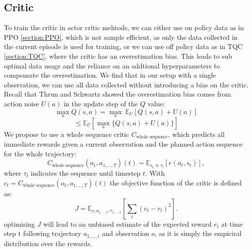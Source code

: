\subsection{Critic}
\label{sec:AC_Critic}
To train the critic in actor critic mehtods, we can either use on policy data as in PPO \ref{section:PPO}, which is not sample efficient, as only the data collected 
in the current episode is used for training, or we can use off policy data as in TQC \ref{section:TQC}, where the critic has an overestimation bias. This 
leads to sub optimal data usage and the reliance on an addtional hyperparameters to compensate the overestimation. We find that in our setup with a single observation, we can use all data 
collected without introducing a bias on the critic. \\
Recall that Thrun and Schwartz \cite{thrun1993issues} showed the overestimation bias comes from action noise $U(a)$ in the update step of the $Q$ value:
\begin{equation*}
    \max_{a}Q(s,a) = \max_{a}\ \mathbb{E}_U \left[Q(s,a) + U(a)\right]
\end{equation*}
\begin{equation}
    \leq \mathbb{E}_U \left[\max_a \{Q(s,a) + U(a)\}\right]
\end{equation}
We propose to use a whole sequence critic $C_{\text{whole sequence}}$, which predicts all immediate rewards given a current observation 
and the planned action sequence for the whole trajectory:
\begin{equation}
    \label{eq:emp_mean_c}
    C_{\text{whole sequence}}(o_1, a_{1, ..., T})(t) = \mathbb{E}_{s_t \propto \tau_t}\left[r(a_t, s_t)\right],
\end{equation}
where $\tau_t$ indicates the sequence until timestep $t$. 
With $c_t = C_{\text{whole sequence}}(o_1, a_{1, ..., T})(t)$ the objective function of the critic is defined as:
\begin{equation}
    J = \mathbb{E}_{o, a_{1, ..., t}, r_{1, ..., t}}\left[\sum_t(c_t - r_t)^2\right].
\end{equation}
optimising $J$ will lead to an unbiased estimate of the expected reward $r_t$ at time step t following trajectory $a_{1, ..., t}$ and observation $o$, as it is simply the empiciral distribution 
over the rewards.\\

